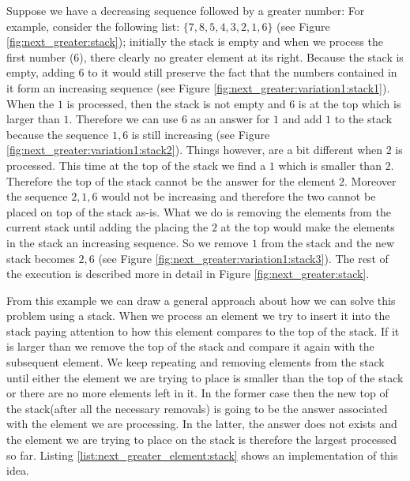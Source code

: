 Suppose we have a decreasing sequence followed by a greater number: For example, consider the
following list: $\{7,8,5, 4, 3, 2, 1, 6\}$ (see Figure \ref{fig:next_greater:stack});
initially the stack is empty and when we process the
first number ($6$), there clearly no greater element at its right. Because the stack is empty,
adding $6$ to it would still preserve the fact that the numbers contained in it form an increasing
sequence (see Figure \ref{fig:next_greater:variation1:stack1}).
When the $1$ is processed, then the stack is not empty and $6$ is at the top which is larger
than $1$. Therefore we can use $6$ as an answer for $1$ and add $1$ to the stack because the
sequence $1,6$ is still increasing (see Figure \ref{fig:next_greater:variation1:stack2}). Things however, are a bit different when $2$ is processed. This
time at the top of the stack we find a $1$ which is smaller  than $2$. Therefore the top of the
stack cannot be the answer for the element $2$. Moreover the sequence $2,1,6$ would not be
increasing and therefore the two cannot be placed on top of the stack as-is. What we do is removing
the elements from the current stack until adding the placing the $2$ at the top
would make the elements in the stack an
increasing sequence. 
So we remove $1$ from the stack and the new stack becomes 
$2,6$ (see Figure \ref{fig:next_greater:variation1:stack3}). 
The rest of the execution is described more in detail in Figure \ref{fig:next_greater:stack}.


From this example we can draw a general approach about how we can solve this problem using a stack. 
When we process an element we try to insert it into the stack paying attention to how this element compares to the top of the stack.
If it is larger than we remove the top of the stack and compare it again with the subsequent element. 
We keep repeating and removing elements from the stack until either the element we are 
trying to place is smaller than the top of the stack or there are no more elements left in it.
In the former case then the new top  of the stack(after all the necessary removals)
is going to be the answer associated with the element we are processing.
In the latter, the answer does not exists and the element we are trying to place on the stack
is therefore the largest processed so far.
Listing \ref{list:next_greater_element:stack} shows an implementation of this idea.





